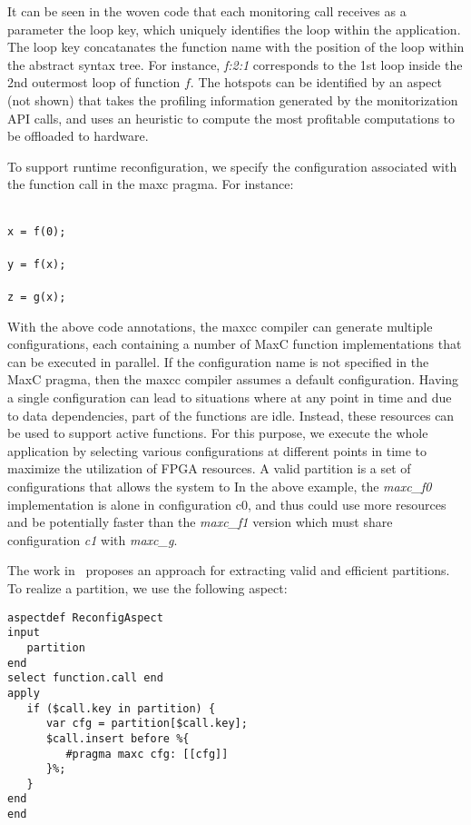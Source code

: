 \noindent It can be seen in the woven code that each monitoring call receives as a parameter the loop key, which uniquely identifies the loop within the application. The loop key concatanates the function name with the position of the loop within the abstract syntax tree. For instance, \emph{f:2:1} corresponds to the 1st loop inside the 2nd outermost loop of function $f$. The hotspots can be identified by an aspect (not shown) that takes the profiling information generated by the monitorization API calls, and uses an heuristic to compute the most profitable computations to be offloaded to hardware.

To support runtime reconfiguration, we specify the configuration associated with the function call in the maxc pragma. For instance:

\noindent\texttt{\footnotesize{\\
x = f(0); \\
\\
y = f(x); \\
\\
z = g(x); \\
}}

\noindent With the above code annotations, the maxcc compiler can generate multiple configurations, each containing  a number of MaxC function implementations that can be executed in parallel. If the configuration name is not specified in the MaxC pragma, then the maxcc compiler assumes a default configuration. Having a single configuration can lead to situations where at any point in time and due to data dependencies, part of the functions are idle. Instead, these resources can be used to support active functions. For this purpose, we execute the whole application by selecting various configurations at different points in time to maximize the utilization of FPGA resources. A valid partition is a set of configurations that allows the system to   In the above example, the \emph{maxc\_f0} implementation is alone in configuration c0, and thus could use more resources and be potentially faster than the \emph{maxc\_f1} version which must share configuration \emph{c1} with \emph{maxc\_g}. 

The work in~\cite{Xinyu:Qiwei:Luk:Qiang:Pell:2012} proposes an approach for extracting valid and efficient partitions. To realize a partition, we use the following aspect:

\lstset{style=lara}
\begin{lstlisting}
aspectdef ReconfigAspect
input 
   partition  
end
select function.call end 
apply
   if ($call.key in partition) {
      var cfg = partition[$call.key];
      $call.insert before %{ 
         #pragma maxc cfg: [[cfg]] 
      }%;
   }
end
end
\end{lstlisting}



